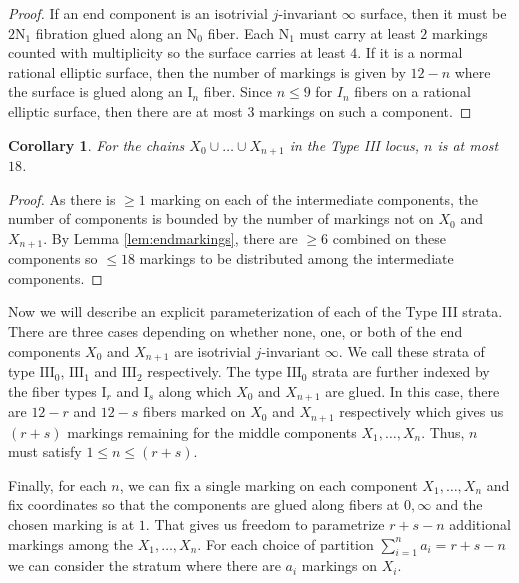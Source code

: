 \documentclass[11pt]{amsart}
\newtheorem{cor}[theorem]{Corollary}
\theoremstyle{definition}
\theoremstyle{remark}
\begin{document}
	\begin{proof} If an end component is an isotrivial $j$-invariant $\infty$ surface, then it must be $2\mathrm{N}_1$ fibration glued along an $\mathrm{N}_0$ fiber. Each $\mathrm{N}_1$ must carry at least $2$ markings counted with multiplicity so the surface carries at least $4$. If it is a normal rational elliptic surface, then the number of markings is given by $12 - n$ where the surface is glued along an $\mathrm{I}_n$ fiber. Since $n \leq 9$ for $I_n$ fibers on a rational elliptic surface, then there are at most $3$ markings on such a component. \end{proof} 
	
	\begin{cor} For the chains $X_0 \cup \ldots \cup X_{n+1}$ in the Type III locus, $n$ is at most $18$. \end{cor}
	
	\begin{proof} As there is $\geq 1$ marking on each of the intermediate components, the number of components is bounded by the number of markings not on $X_0$ and $X_{n+1}$. By Lemma \ref{lem:endmarkings}, there are $\geq 6$ combined on these components so $\leq 18$ markings to be distributed among the intermediate components. 
	\end{proof} 
	
	Now we will describe an explicit parameterization of each of the Type III strata. There are three cases depending on whether none, one, or both of the end components $X_0$ and $X_{n+1}$ are isotrivial $j$-invariant $\infty$. We call these strata of type $\mathrm{III}_0$, $\mathrm{III}_1$ and $\mathrm{III}_2$ respectively. The type $\mathrm{III}_0$ strata are further indexed by the fiber types $\mathrm{I}_{r}$ and $\mathrm{I}_{s}$ along which $X_0$ and $X_{n+1}$ are glued. In this case, there are $12 - r$ and $12-s$ fibers marked on $X_0$ and $X_{n+1}$ respectively which gives us $(r + s)$ markings remaining for the middle components $X_1, \ldots, X_n$. Thus, $n$ must satisfy 
	$
	1 \le n \le (r + s).
	$
	
	Finally, for each $n$, we can fix a single marking on each component $X_1, \ldots, X_n$ and fix coordinates so that the components are glued along fibers at $0, \infty$ and the chosen marking is at $1$. That gives us freedom to parametrize $r + s - n$ additional markings among the $X_1, \ldots, X_n$. For each choice of partition
	$
	\sum_{i = 1}^n a_i = r + s - n
	$
	we can consider the stratum where there are $a_i$ markings on $X_i$.
	
\end{document}

